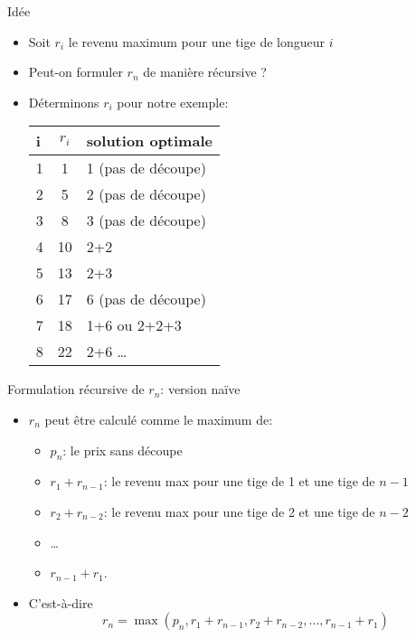 \begin{frame}{Idée}
\begin{itemize}
\item Soit $r_i$ le revenu maximum pour une tige de longueur $i$
\item Peut-on formuler $r_n$ de manière récursive ?
\item Déterminons $r_i$ pour notre exemple:
\begin{center}
\footnotesize
\begin{tabular}{l|cl}
i & $r_i$ & solution optimale\\
\hline
1 & 1 & 1 (pas de découpe)\\
2 & 5 & 2 (pas de découpe)\\
3 & 8 & 3 (pas de découpe)\\
4 & 10 & 2+2\\
5 & 13 & 2+3\\
6 & 17 & 6 (pas de découpe)\\
7 & 18 & 1+6 ou 2+2+3\\
8 & 22 & 2+6
\ldots\\
\end{tabular}
\end{center}
\end{itemize}

\end{frame}

\begin{frame}{Formulation récursive de $r_n$: version naïve}
\begin{itemize}
\item $r_n$ peut être calculé comme le maximum de:
\begin{itemize}
\item $p_n$: le prix sans découpe
\item $r_1+r_{n-1}$: le revenu max pour une tige de 1 et une tige de $n-1$
\item $r_2+r_{n-2}$: le revenu max  pour une tige de 2 et une tige de $n-2$
\item \ldots
\item $r_{n-1}+r_1$.
\end{itemize}
\item C'est-à-dire $$r_n=\max(p_n,r_1+r_{n-1},r_2+r_{n-2},\ldots,r_{n-1}+r_1)$$
\end{itemize}
\end{frame}

